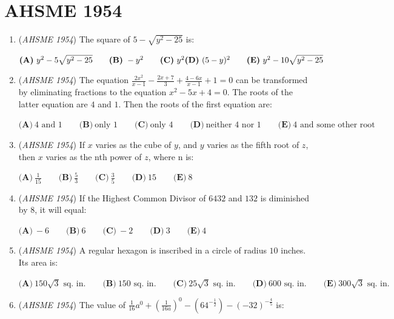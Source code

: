 \section{AHSME 1954}
        \begin{enumerate}
        	\item (\textit{AHSME 1954}) The square of $5-\sqrt{y^2-25}$ is: 


 $\textbf{(A)}\ y^2-5\sqrt{y^2-25} \qquad \textbf{(B)}\ -y^2 \qquad \textbf{(C)}\ y^2 \\ \textbf{(D)}\ (5-y)^2\qquad\textbf{(E)}\ y^2-10\sqrt{y^2-25}$


	\item (\textit{AHSME 1954}) The equation $\frac{2x^2}{x-1}-\frac{2x+7}{3}+\frac{4-6x}{x-1}+1=0$ can be transformed by eliminating fractions to the equation $x^2-5x+4=0$. 
The roots of the latter equation are $4$ and $1$. Then the roots of the first equation are: 


 $\textbf{(A)}\ 4 \text{ and }1 \qquad \textbf{(B)}\ \text{only }1 \qquad \textbf{(C)}\ \text{only }4 \qquad \textbf{(D)}\ \text{neither 4 nor 1}\qquad\textbf{(E)}\ \text{4 and some other root}$


	\item (\textit{AHSME 1954}) If $x$ varies as the cube of $y$, and $y$ varies as the fifth root of $z$, then $x$ varies as the nth power of $z$, where n is:


 $\textbf{(A)}\ \frac{1}{15} \qquad\textbf{(B)}\ \frac{5}{3} \qquad\textbf{(C)}\ \frac{3}{5} \qquad\textbf{(D)}\ 15\qquad\textbf{(E)}\ 8$


	\item (\textit{AHSME 1954}) If the Highest Common Divisor of $6432$ and $132$ is diminished by $8$, it will equal: 


 $\textbf{(A)}\ -6 \qquad \textbf{(B)}\ 6 \qquad \textbf{(C)}\ -2 \qquad \textbf{(D)}\ 3 \qquad \textbf{(E)}\ 4$


	\item (\textit{AHSME 1954}) A regular hexagon is inscribed in a circle of radius $10$ inches. Its area is: 


 $\textbf{(A)}\ 150\sqrt{3} \text{ sq. in.} \qquad \textbf{(B)}\ \text{150 sq. in.} \qquad \textbf{(C)}\ 25\sqrt{3}\text{ sq. in.}\qquad\textbf{(D)}\ \text{600 sq. in.}\qquad\textbf{(E)}\ 300\sqrt{3}\text{ sq. in.}$


	\item (\textit{AHSME 1954}) The value of $\frac{1}{16}a^0+\left (\frac{1}{16a} \right )^0- \left (64^{-\frac{1}{2}} \right )- (-32)^{-\frac{4}{5}}$ is: 



\end{enumerate}
